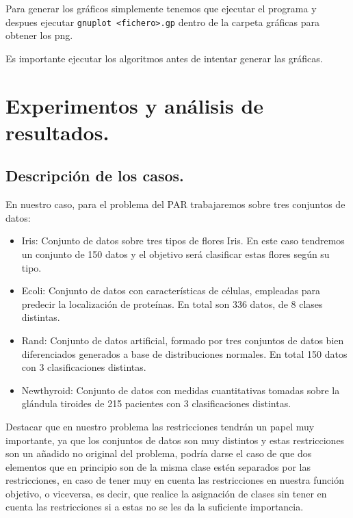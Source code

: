 \documentclass[12pt, spanish]{article}
\begin{document}
Para generar los gráficos simplemente tenemos que ejecutar el programa y despues ejecutar \texttt{gnuplot <fichero>.gp} dentro de la carpeta gráficas para obtener los png.


Es importante ejecutar los algoritmos antes de intentar generar las gráficas.

\newpage




\section{Experimentos y análisis de resultados.}


\subsection{Descripción de los casos.}

En nuestro caso, para el problema del PAR trabajaremos sobre tres conjuntos de datos:

\begin{itemize}
	\item{Iris: Conjunto de datos sobre tres tipos de flores Iris. En este caso tendremos un conjunto de 150 datos y el objetivo será clasificar estas flores según su tipo.}
	\item{Ecoli: Conjunto de datos con características de células, empleadas para predecir la localización de proteínas. En total son 336 datos, de 8 clases distintas.}
	\item{Rand: Conjunto de datos artificial, formado por tres conjuntos de datos bien diferenciados generados a base de distribuciones normales. En total 150 datos con 3 clasificaciones distintas.}
	\item{Newthyroid: Conjunto de datos con medidas cuantitativas tomadas sobre la glándula tiroides de 215 pacientes con 3 clasificaciones distintas.}
\end{itemize}

Destacar que en nuestro problema las restricciones tendrán un papel muy importante, ya que los conjuntos de datos son muy distintos y estas restricciones son un añadido no original del problema, podría darse el caso de que dos elementos que en principio son de la misma clase estén separados por las restricciones, en caso de tener muy en cuenta las restricciones en nuestra función objetivo, o viceversa, es decir, que realice la asignación de clases sin tener en cuenta las restricciones si a estas no se les da la suficiente importancia.
\end{document}
